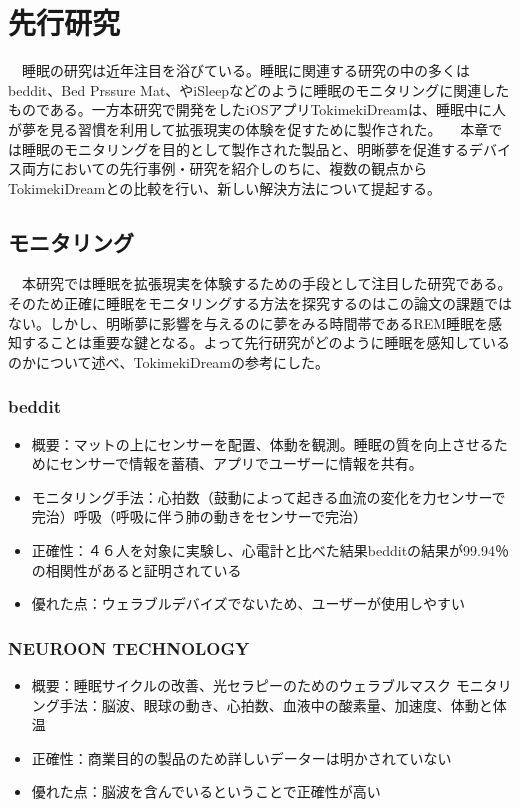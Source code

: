 \chapter{先行研究}
\label{chap:search}

　睡眠の研究は近年注目を浴びている。睡眠に関連する研究の中の多くはbeddit\cite{beddit}、Bed Prssure Mat、やiSleep\cite{iSleep}などのように睡眠のモニタリングに関連したものである。一方本研究で開発をしたiOSアプリTokimekiDreamは、睡眠中に人が夢を見る習慣を利用して拡張現実の体験を促すために製作された。
　本章では睡眠のモニタリングを目的として製作された製品と、明晰夢を促進するデバイス両方においての先行事例・研究を紹介しのちに、複数の観点からTokimekiDreamとの比較を行い、新しい解決方法について提起する。

\section{モニタリング}
　本研究では睡眠を拡張現実を体験するための手段として注目した研究である。そのため正確に睡眠をモニタリングする方法を探究するのはこの論文の課題ではない。しかし、明晰夢に影響を与えるのに夢をみる時間帯であるREM睡眠を感知することは重要な鍵となる。よって先行研究がどのように睡眠を感知しているのかについて述べ、TokimekiDreamの参考にした。

\subsection{beddit}
\begin{itemize}
\item 概要：マットの上にセンサーを配置、体動を観測。睡眠の質を向上させるためにセンサーで情報を蓄積、アプリでユーザーに情報を共有。
\item モニタリング手法：心拍数（鼓動によって起きる血流の変化を力センサーで完治）呼吸（呼吸に伴う肺の動きをセンサーで完治）\cite{beddit}
\item 正確性：４６人を対象に実験し、心電計と比べた結果bedditの結果が99.94％の相関性があると証明されている
\item 優れた点：ウェラブルデバイズでないため、ユーザーが使用しやすい
\end{itemize}

\subsection{NEUROON TECHNOLOGY}
\begin{itemize}
\item 概要：睡眠サイクルの改善、光セラピーのためのウェラブルマスク
モニタリング手法：脳波、眼球の動き、心拍数、血液中の酸素量、加速度、体動と体温 \cite{neuroon}
\item 正確性：商業目的の製品のため詳しいデーターは明かされていない
\item 優れた点：脳波を含んでいるということで正確性が高い
\end{itemize}


